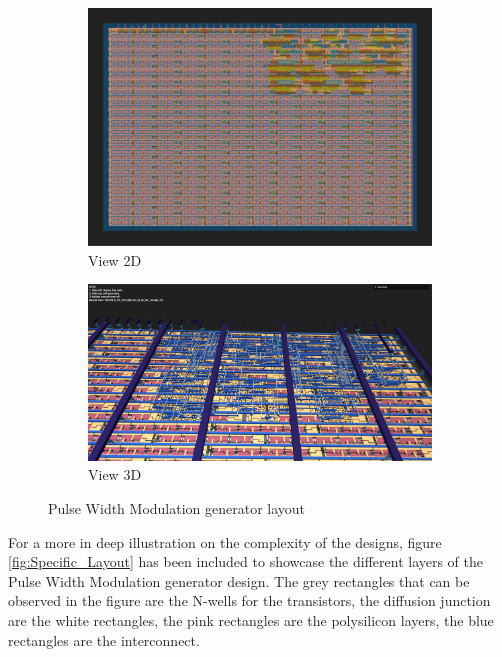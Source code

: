 \begin{figure}[H]
    \centering
    \begin{subfigure}[b]{0.45\textwidth}
        \includegraphics[width=\linewidth]{Pictures/Result_PWM_2D_View.png}
        \caption{View 2D}\label{fig:PWM_2D}
    \end{subfigure}
    \begin{subfigure}[b]{0.45\textwidth}
        \includegraphics[width=\linewidth]{Pictures/Result_PWM_3D_View.png}
        \caption{View 3D}\label{fig:PWM_3D}
    \end{subfigure}
    \caption{Pulse Width Modulation generator layout}\label{fig:PWM}
\end{figure}



For a more in deep illustration on the complexity of the designs, figure \ref*{fig:Specific_Layout} 
has been included to showcase the different layers of the Pulse Width Modulation generator design.
The grey rectangles that can be observed in the figure are the N-wells for the transistors, 
the diffusion junction are the white rectangles, the pink rectangles are the polysilicon layers, 
the blue rectangles are the interconnect. 

